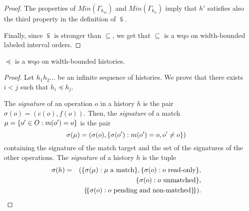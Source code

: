 \begin{proof}
The properties of $Min(\Gamma_{k_m})$ and $Min(\Gamma_{k_n})$ imply that $h'$ satisfies also the third property in the definition of $\subseteqq$.

Finally, since $\subseteqq$ is stronger than $\subseteq$, we get that $\subseteq$ is a wqo on width-bounded labeled interval orders.
\end{proof} 

\begin{lemma}

  $\preceq$ is a wqo on width-bounded histories.

\end{lemma}

\begin{proof}

%
%

Let $h_1 h_2\ldots $ be an infinite sequence of histories. We prove that there exists $i<j$ such that $h_i\preceq h_j$.

The \emph{signature} of an operation $o$ in a history $h$ is the pair $\sigma(o)=(c(o),f(o))$.
Then, the \emph{signature} of a match $\mu={\{{ o' \in O : m(o') = o}\}}$ is the pair 
\[
\sigma(\mu)=(\sigma(o),{\{{\sigma(o') : m(o')=o, o'\neq o}\}})
\]
containing the signature of the match target and the set of the signatures of the other operations.
The \emph{signature} of a history $h$ is the tuple 
\begin{align*}
\sigma(h)&=&({\{{\sigma(\mu): \mu\mbox{ a match}}\}}, {\{{\sigma(o): o\mbox{ read-only}}\}}, \\
&& {\{{\sigma(o): o\mbox{ unmatched}}\}}, \\
&& {\{\!\{ \sigma(o): o\mbox{ pending and non-matched} \}\!\}}).
\end{align*}


\end{proof}
